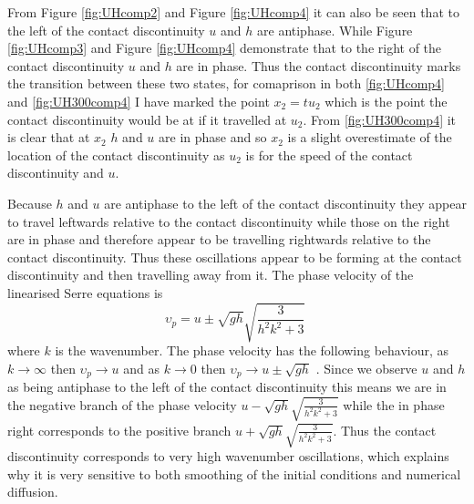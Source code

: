 \documentclass[SingleSpace,12pt,Journal]{Serre_ASCE}
\begin{document}
From Figure \ref{fig:UHcomp2} and Figure \ref{fig:UHcomp4} it can also be seen that to the left of the contact discontinuity $u$ and $h$ are antiphase. While Figure \ref{fig:UHcomp3} and Figure \ref{fig:UHcomp4} demonstrate that to the right of the contact discontinuity $u$ and $h$ are in phase. Thus the contact discontinuity marks the transition between these two states, for comaprison in both \ref{fig:UHcomp4} and \ref{fig:UH300comp4} I have marked the point $x_2 = tu_2$ which is the point the contact discontinuity would be at if it travelled at $u_2$. From \ref{fig:UH300comp4} it is clear that at $x_2$ $h$ and $u$ are in phase and so $x_2$ is a slight overestimate of the location of the contact discontinuity as $u_2$ is for the speed of the contact discontinuity and $u$.

Because $h$ and $u$ are antiphase to the left of the contact discontinuity they appear to travel leftwards relative to the contact discontinuity while those on the right are in phase and therefore appear to be travelling rightwards relative to the contact discontinuity. Thus these oscillations appear to be forming at the contact discontinuity and then travelling away from it. The phase velocity of the linearised Serre equations is 
\[\upsilon_p = u \pm \sqrt{gh} \sqrt{\frac{3}{h^2 k^2 + 3}} \; \]
where $k$ is the wavenumber. The phase velocity has the following behaviour, as $k \rightarrow \infty$ then $\upsilon_p \rightarrow u$ and as $k \rightarrow 0$ then $\upsilon_p \rightarrow u \pm \sqrt{gh}$ . Since we observe $u$ and $h$ as being antiphase to the left of the contact discontinuity this means we are in the negative branch of the phase velocity $u - \sqrt{gh} \sqrt{\frac{3}{h^2 k^2 + 3}}$ while the in phase right corresponds to the positive branch  $u + \sqrt{gh} \sqrt{\frac{3}{h^2 k^2 + 3}}$. Thus the contact discontinuity corresponds to very high wavenumber oscillations, which explains why it is very sensitive to both smoothing of the initial conditions and numerical diffusion.   

\end{document}
